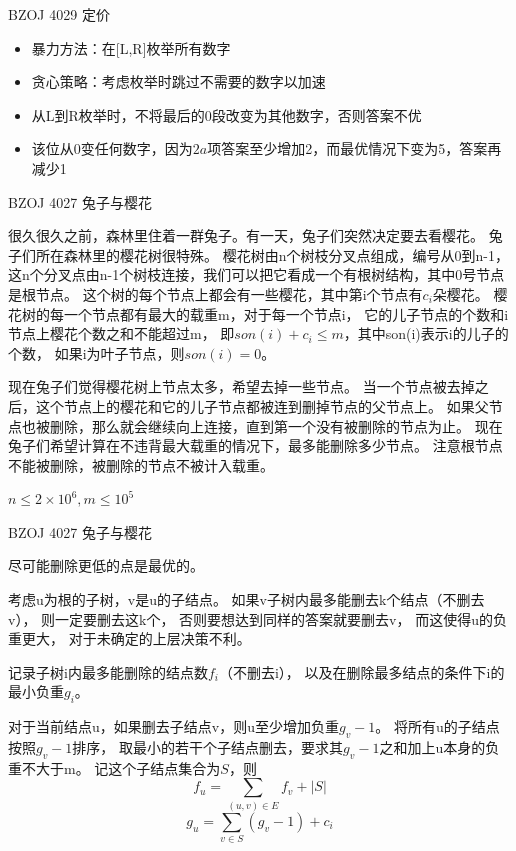 \documentclass{beamer}
\begin{document}
\begin{frame}{BZOJ 4029 定价}

    \begin{itemize}
        \item 暴力方法：在[L,R]枚举所有数字
        \item 贪心策略：考虑枚举时跳过不需要的数字以加速
        \item 从L到R枚举时，不将最后的0段改变为其他数字，否则答案不优
        \item 该位从0变任何数字，因为$2a$项答案至少增加2，而最优情况下变为5，答案再减少1
    \end{itemize}
    
\end{frame}

\begin{frame}{BZOJ 4027 兔子与樱花}

    很久很久之前，森林里住着一群兔子。有一天，兔子们突然决定要去看樱花。
    兔子们所在森林里的樱花树很特殊。
    樱花树由n个树枝分叉点组成，编号从0到n-1，
    这n个分叉点由n-1个树枝连接，我们可以把它看成一个有根树结构，其中0号节点是根节点。
    这个树的每个节点上都会有一些樱花，其中第i个节点有$c_i$朵樱花。
    樱花树的每一个节点都有最大的载重m，对于每一个节点i，
    它的儿子节点的个数和i节点上樱花个数之和不能超过m，
    即$son(i) + c_i \leq m$，其中son(i)表示i的儿子的个数，
    如果i为叶子节点，则$son(i) = 0$。

    现在兔子们觉得樱花树上节点太多，希望去掉一些节点。
    当一个节点被去掉之后，这个节点上的樱花和它的儿子节点都被连到删掉节点的父节点上。
    如果父节点也被删除，那么就会继续向上连接，直到第一个没有被删除的节点为止。
    现在兔子们希望计算在不违背最大载重的情况下，最多能删除多少节点。
    注意根节点不能被删除，被删除的节点不被计入载重。

    $n\leq 2\times 10^6, m\leq 10^5$
    
\end{frame}

\begin{frame}{BZOJ 4027 兔子与樱花}

    尽可能删除更低的点是最优的。

    考虑u为根的子树，v是u的子结点。
    如果v子树内最多能删去k个结点（不删去v），
    则一定要删去这k个，
    否则要想达到同样的答案就要删去v，
    而这使得u的负重更大，
    对于未确定的上层决策不利。

    记录子树i内最多能删除的结点数$f_i$（不删去i），
    以及在删除最多结点的条件下i的最小负重$g_i$。

    对于当前结点u，如果删去子结点v，则u至少增加负重$g_v-1$。
    将所有u的子结点按照$g_v-1$排序，
    取最小的若干个子结点删去，要求其$g_v-1$之和加上u本身的负重不大于m。
    记这个子结点集合为$S$，则
    $$f_u=\sum_{(u,v)\in E}{f_v}+|S|$$
    $$g_u=\sum_{v \in S}{(g_v-1)}+c_i$$
    
\end{frame}
\end{document}
